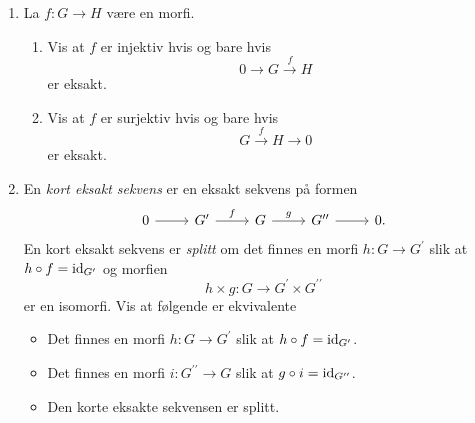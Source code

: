 \begin{enumerate}[resume]
    \item La $f\colon G\to H$ være en morfi.
        \begin{enumerate}
            \item Vis at $f$ er injektiv hvis og bare hvis
                \[
                    0\to G\xrightarrow{f} H
                \]
                er eksakt.
            \item Vis at $f$ er surjektiv hvis og bare hvis
                \[
                    G\xrightarrow{f} H\to 0
                \]
                er eksakt.
        \end{enumerate}
    \item En \textit{kort eksakt sekvens} er en eksakt sekvens på
        formen
        \[\begin{tikzcd}
            0
            \rar
            &
            G^\prime
            \rar{f}
            &
            G
            \rar{g}
            &
            G^{\prime\prime}
            \rar
            &0.
        \end{tikzcd}\]
        En kort eksakt sekvens er \textit{splitt}
        om det finnes en morfi $h\colon G\to G^\prime$
        slik at $h\circ f = \operatorname{id}_{G^\prime}$
        og morfien
        \[
            h\times g\colon G\to G^\prime\times G^{\prime\prime}
        \]
        er en isomorfi.
        Vis at følgende er ekvivalente
        \begin{itemize}
            \item Det finnes en morfi $h\colon G\to G^\prime$
                slik at $h\circ f = \operatorname{id}_{G^\prime}$.
            \item Det finnes en morfi $i\colon G^{\prime\prime}\to G$
                slik at $g\circ i = \operatorname{id}_{G^{\prime\prime}}$.
            \item Den korte eksakte sekvensen er splitt.
        \end{itemize}
\end{enumerate}

